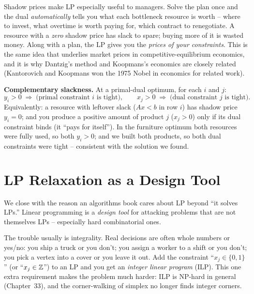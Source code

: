 \begin{aestheticbox}
Shadow prices make LP especially useful to managers. Solve the plan once and the dual
\emph{automatically} tells you what each bottleneck resource is worth -- where
to invest, what overtime is worth paying for, which contract to renegotiate.
A resource with a \emph{zero} shadow price has slack to spare; buying more of it
is wasted money. Along with a plan, the LP gives you the
\emph{prices of your constraints}. This is the same idea that underlies market
prices in competitive-equilibrium economics, and it is why Dantzig's method and
Koopmans's economics are closely related (Kantorovich and Koopmans won the 1975
Nobel in economics for related work).
\end{aestheticbox}

\begin{formalbox}
\textbf{Complementary slackness.}
At a primal-dual optimum, for each $i$ and $j$:
\[
y_i > 0 \;\Rightarrow\; \text{(primal constraint $i$ is tight)},\qquad
x_j > 0 \;\Rightarrow\; \text{(dual constraint $j$ is tight)}.
\]
Equivalently: a resource with leftover slack ($Ax < b$ in row $i$) has shadow
price $y_i = 0$; and you produce a positive amount of product $j$ ($x_j > 0$)
only if its dual constraint binds (it ``pays for itself''). In the furniture
optimum both resources were fully used, so both $y_i > 0$; and we built both
products, so both dual constraints were tight -- consistent with the solution we
found.
\end{formalbox}

\section{LP Relaxation as a Design Tool}
\label{ch28:relaxation}

We close with the reason an algorithms book cares about LP beyond ``it solves
LPs.'' Linear programming is a \emph{design tool} for attacking problems that
are not themselves LPs -- especially hard combinatorial ones.

The trouble usually is integrality. Real decisions are often whole numbers or
yes/no: you ship a truck or you don't; you assign a worker to a shift or you
don't; you pick a vertex into a cover or you leave it out. Add the constraint
``$x_j \in \{0,1\}$'' (or ``$x_j \in \mathbb{Z}$'') to an LP and you get an
\emph{integer linear program} (ILP). This one extra requirement makes the problem much
harder: ILP is NP-hard in general (Chapter~33), and the corner-walking
of simplex no longer finds integer corners.

